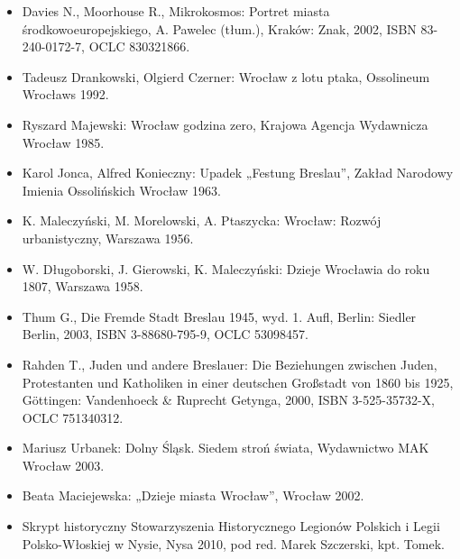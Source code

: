 \documentclass{article}
\begin{document}
\begin{itemize}
  \item Davies N., Moorhouse R., Mikrokosmos: Portret miasta środkowoeuropejskiego, A. Pawelec (tłum.), Kraków: Znak, 2002, ISBN 83-240-0172-7, OCLC 830321866.
  \item Tadeusz Drankowski, Olgierd Czerner: Wrocław z lotu ptaka, Ossolineum Wrocławs 1992.
  \item Ryszard Majewski: Wrocław godzina zero, Krajowa Agencja Wydawnicza Wrocław 1985.
  \item Karol Jonca, Alfred Konieczny: Upadek „Festung Breslau”, Zakład Narodowy Imienia Ossolińskich Wrocław 1963.
  \item K. Maleczyński, M. Morelowski, A. Ptaszycka: Wrocław: Rozwój urbanistyczny, Warszawa 1956.
  \item W. Długoborski, J. Gierowski, K. Maleczyński: Dzieje Wrocławia do roku 1807, Warszawa 1958.
  \item Thum G., Die Fremde Stadt Breslau 1945, wyd. 1. Aufl, Berlin: Siedler Berlin, 2003, ISBN 3-88680-795-9, OCLC 53098457.
  \item Rahden T., Juden und andere Breslauer: Die Beziehungen zwischen Juden, Protestanten und Katholiken in einer deutschen Großstadt von 1860 bis 1925, Göttingen: Vandenhoeck \& Ruprecht Getynga, 2000, ISBN 3-525-35732-X, OCLC 751340312.
  \item Mariusz Urbanek: Dolny Śląsk. Siedem stroń świata, Wydawnictwo MAK Wrocław 2003.
  \item Beata Maciejewska: „Dzieje miasta Wrocław”, Wrocław 2002.
  \item Skrypt historyczny Stowarzyszenia Historycznego Legionów Polskich i Legii Polsko-Włoskiej w Nysie, Nysa 2010, pod red. Marek Szczerski, kpt. Tomek.
\end{itemize}
\end{document}
